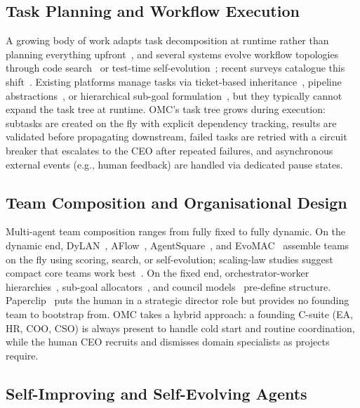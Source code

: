 \documentclass[11pt,a4paper]{article}
\begin{document}
\subsection{Task Planning and Workflow Execution}
\label{sec:rw-workflow}

A growing body of work adapts task decomposition at runtime rather than planning everything upfront~\cite{wang2025tdag, erdogan2025planact, paglieri2025learnplan}, and several systems evolve workflow topologies through code search~\cite{zhang2025aflow} or test-time self-evolution~\cite{hu2025evomac}; recent surveys catalogue this shift~\cite{yu2025workflowsurvey, huang2025plansurvey}. Existing platforms manage tasks via ticket-based inheritance~\cite{paperclip2025}, pipeline abstractions~\cite{gao2025agentscope}, or hierarchical sub-goal formulation~\cite{agentorchestra2025}, but they typically cannot expand the task tree at runtime. OMC's task tree grows during execution: subtasks are created on the fly with explicit dependency tracking, results are validated before propagating downstream, failed tasks are retried with a circuit breaker that escalates to the CEO after repeated failures, and asynchronous external events (e.g., human feedback) are handled via dedicated pause states.


\subsection{Team Composition and Organisational Design}
\label{sec:rw-org}

Multi-agent team composition ranges from fully fixed to fully dynamic. On the dynamic end, DyLAN~\cite{liu2025dylan}, AFlow~\cite{zhang2025aflow}, AgentSquare~\cite{shang2025agentsquare}, and EvoMAC~\cite{hu2025evomac} assemble teams on the fly using scoring, search, or self-evolution; scaling-law studies suggest compact core teams work best~\cite{qian2025macnet, tran2025masurvey}. On the fixed end, orchestrator-worker hierarchies~\cite{fourney2024magenticone, hu2025owl}, sub-goal allocators~\cite{agentorchestra2025}, and council models~\cite{teamofrivals2025} pre-define structure. Paperclip~\cite{paperclip2025} puts the human in a strategic director role but provides no founding team to bootstrap from. OMC takes a hybrid approach: a founding C-suite (EA, HR, COO, CSO) is always present to handle cold start and routine coordination, while the human CEO recruits and dismisses domain specialists as projects require.

\subsection{Self-Improving and Self-Evolving Agents}
\label{sec:rw-selfevo}
\end{document}
